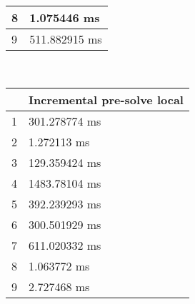 \begin{multicols}{2}
\begin{tabular}{|l|l|}
		8 & 1.075446 ms \\ \hline
		9 & 511.882915 ms \\ \hline
	\end{tabular}\\
	\begin{tabular}{|l|l|}
		\hline
		& Incremental pre-solve local \\ \hline
		1 & 301.278774 ms \\ \hline
		2 & 1.272113 ms \\ \hline
		3 & 129.359424 ms \\ \hline
		4 & 1483.78104 ms \\ \hline
		5 & 392.239293 ms \\ \hline
		6 & 300.501929 ms \\ \hline
		7 & 611.020332 ms \\ \hline
		8 & 1.063772 ms \\ \hline
		9 & 2.727468 ms \\ \hline
	\end{tabular}\\
\end{multicols}\pagebreak
